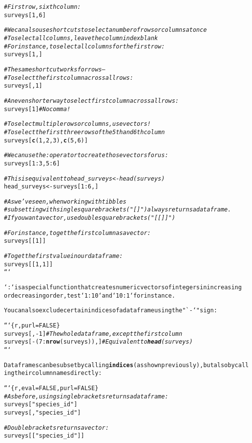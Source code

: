 \documentclass{article}\usepackage[]{graphicx}\usepackage[]{xcolor}
\makeatletter
\newcommand{\hlstr}[1]{\textcolor[rgb]{0.192,0.494,0.8}{#1}}%
\newcommand{\hlcom}[1]{\textcolor[rgb]{0.678,0.584,0.686}{\textit{#1}}}%
\newcommand{\hlkwd}[1]{\textcolor[rgb]{0.737,0.353,0.396}{\textbf{#1}}}%
\newenvironment{kframe}{%
 \def\at@end@of@kframe{}%
 \ifinner\ifhmode%
  \def\at@end@of@kframe{\end{minipage}}%
  \begin{minipage}{\columnwidth}%
 \fi\fi%
 \def\FrameCommand##1{\hskip\@totalleftmargin \hskip-\fboxsep
 \colorbox{shadecolor}{##1}\hskip-\fboxsep
     \hskip-\linewidth \hskip-\@totalleftmargin \hskip\columnwidth}%
 \MakeFramed {\advance\hsize-\width
   \@totalleftmargin\z@ \linewidth\hsize
   \@setminipage}}%
 {\par\unskip\endMakeFramed%
 \at@end@of@kframe}
\newenvironment{knitrout}{}{} %
\makeatother
\begin{document}
\begin{knitrout}
\begin{kframe}
\begin{alltt}
\hlcom{# First row, sixth column:}
surveys[1, 6]   

\hlcom{# We can also use shortcuts to select a number of rows or columns at once}
\hlcom{# To select all columns, leave the column index blank}
\hlcom{# For instance, to select all columns for the first row:}
surveys[1, ]

\hlcom{# The same shortcut works for rows --}
\hlcom{# To select the first column across all rows:}
surveys[, 1]

\hlcom{# An even shorter way to select first column across all rows:}
surveys[1] \hlcom{# No comma! }

\hlcom{# To select multiple rows or columns, use vectors!}
\hlcom{# To select the first three rows of the 5th and 6th column}
surveys[\hlkwd{c}(1, 2, 3), \hlkwd{c}(5, 6)] 

\hlcom{# We can use the : operator to create those vectors for us:}
surveys[1:3, 5:6] 

\hlcom{# This is equivalent to head_surveys <- head(surveys)}
head_surveys <- surveys[1:6, ]

\hlcom{# As we've seen, when working with tibbles }
\hlcom{# subsetting with single square brackets ("[]") always returns a data frame.}
\hlcom{# If you want a vector, use double square brackets ("[[]]")}

\hlcom{# For instance, to get the first column as a vector:}
surveys[[1]]

\hlcom{# To get the first value in our data frame:}
surveys[[1, 1]]
```

`:` is a special function that creates numeric vectors of integers in increasing
or decreasing order, test `1:10` and `10:1` for instance.

You can also exclude certain indices of a data frame using the \hlstr{"`-`"} sign:

```\{r, purl=FALSE\}
surveys[, -1]                 \hlcom{# The whole data frame, except the first column}
surveys[-(7:\hlkwd{nrow}(surveys)), ] \hlcom{# Equivalent to \hlkwd{head}(surveys)}
```

Data frames can be subset by calling \hlkwd{indices} (as shown previously), but also by calling their column names directly:

```\{r, eval = FALSE, purl=FALSE\}
\hlcom{# As before, using single brackets returns a data frame:}
surveys[\hlstr{"species_id"}]
surveys[, \hlstr{"species_id"}]

\hlcom{# Double brackets returns a vector:}
surveys[[\hlstr{"species_id"}]]


\end{alltt}
\end{kframe}
\end{knitrout}
\end{document}
